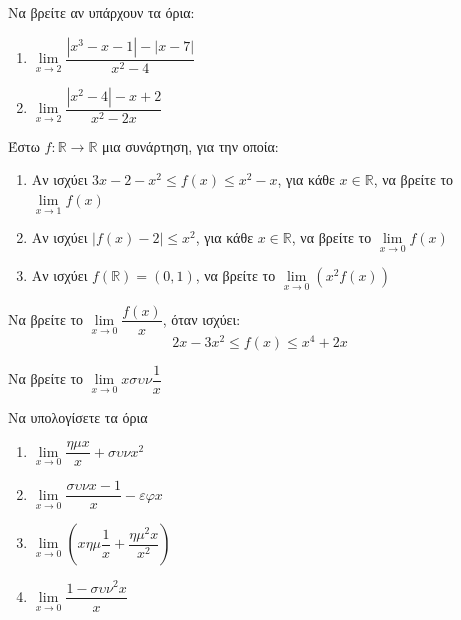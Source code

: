 \documentclass{presentation}
\begin{document}
\begin{askisi}
  Να βρείτε αν υπάρχουν τα όρια:
  \begin{enumerate}
    \item $\lim\limits_{x \to 2}{ \dfrac{|x^3-x-1|-|x-7|}{x^2-4} }$ \pause
    \item $\lim\limits_{x \to 2}{ \dfrac{|x^2-4|-x+2}{x^2-2x} }$
  \end{enumerate}

\end{askisi}

\begin{askisi}
  Έστω $f:\mathbb{R}\to\mathbb{R}$ μια συνάρτηση, για την οποία:
  \begin{enumerate}
    \item Αν ισχύει $3x-2-x^2\le f(x) \le x^2-x$, για κάθε $x\in\mathbb{R}$, να βρείτε το $\lim\limits_{x \to 1}{ f(x) }$ \pause
    \item Αν ισχύει $|f(x)-2|\le x^2$, για κάθε $x\in\mathbb{R}$, να βρείτε το $\lim\limits_{x \to 0}{ f(x) }$ \pause
    \item Αν ισχύει $f(\mathbb{R})=(0,1)$, να βρείτε το $\lim\limits_{x \to 0}{ \left(x^2f(x)  \right) }$
  \end{enumerate}

\end{askisi}

\begin{askisi}
  Να βρείτε το $\lim\limits_{x \to 0}{ \dfrac{f(x)}{x} }$, όταν ισχύει:
  $$2x-3x^2\le f(x) \le x^4+2x$$

\end{askisi}

\begin{askisi}
  Να βρείτε το $\lim\limits_{x \to 0}{ xσυν\dfrac{1}{x} }$

\end{askisi}

\begin{askisi}
  Να υπολογίσετε τα όρια
  \begin{enumerate}
    \item $\lim\limits_{x \to 0}{ \dfrac{ημx}{x}+συνx^2 }$ \pause
    \item $\lim\limits_{x \to 0}{ \dfrac{συνx-1}{x}-εφx }$ \pause
    \item $\lim\limits_{x \to 0}{ \left( xημ\dfrac{1}{x}+\dfrac{ημ^2x}{x^2} \right)}$ \pause
    \item $\lim\limits_{x \to 0}{ \dfrac{1-συν^2x}{x} }$
  \end{enumerate}

\end{askisi}
\end{document}
